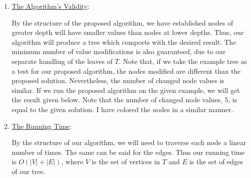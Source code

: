 \begin{solution}
\begin{enumerate}
        \item \underline{The Algorithm's Validity}:

        \hop
        By the structure of the proposed algorithm, we have established nodes of greater depth will have smaller values than nodes at lower depths. Thus, our algorithm will produce a tree which comports with the desired result. The minimum number of value modifications is also guaranteed, due to our separate handling of the leaves of $T$. Note that, if we take the example tree as a test for our proposed algorithm, the nodes modified are different than the proposed solution. Nevertheless, the number of changed node values is similar. If we run the proposed algorithm on the given example, we will get the result given below. Note that the number of changed node values, 5, is equal to the given solution. I have colored the nodes in a similar manner. 
        \vspace{10mm}
        \begin{center}
        \end{center}

        \item \underline{The Running Time}:

        \hop
        By the structure of our algorithm, we will need to traverse each node a linear number of times. The same can be said for the edges. Thus our running time is $O(|V| + |E|)$, where $V$ is the set of vertices in $T$ and $E$ is the set of edges of our tree.
    \end{enumerate}
\end{solution}
\newpage
